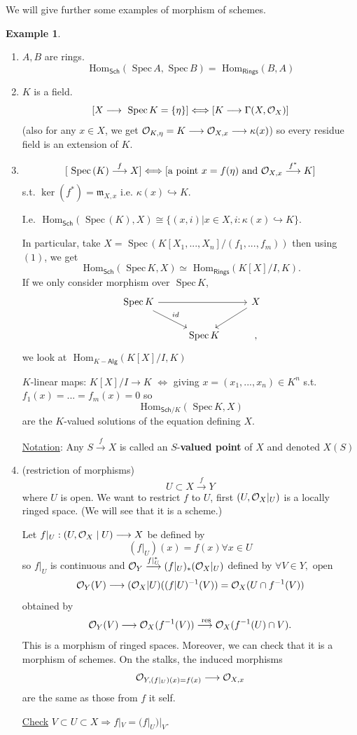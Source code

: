 \documentclass[11pt]{article}
\theoremstyle{definition}
\newtheorem{ex}[thm]{Example}
\renewcommand{\hom}{\text{ Hom}}
\newcommand{\spec}{\text{ Spec}\,}
\newcommand{\res}{\text{ res}}
\newcommand{\scm}{{\mathfrak m}}
\newcommand{\calo}{{\cal O}}
\newcommand{\Lrta}{\Longrightarrow}
\newcommand{\lrta}{\longrightarrow}
\newcommand{\Llrta}{\Longleftrightarrow}
\newcommand{\inj}{\hookrightarrow}
\begin{document}
We will give further some examples of morphism of schemes.
\begin{ex}\ 
\begin{enumerate}[label=(\arabic*)]
\item $A, B$ are rings. 
$$
\hom_{\mathsf{Sch}}(\spec A,\spec B)=\hom_{\mathsf{Rings}}(B,A)
$$
\item $K$ is a field.
$$
[X\lrta \spec K=\{\eta\}]\Llrta [K\lrta \Gamma(X,\calo_X)]
$$
(also for any $x\in X$, we get $\calo_{K,\eta}=K\lrta \calo_{X,x}\lrta \kappa(x)$) so every residue field is an extension of $K$.
\item $$
[\spec(K)\overset{f}{\lrta } X]\Llrta [\text{a point $x=f(\eta)$ and } \calo_{X,x}\overset{f^*}{\lrta } K]
$$
s.t. $\ker(f^*)=\scm_{X,x}$ i.e. $\kappa(x)\inj K$.

I.e. $\hom_{\mathsf{Sch}}(\spec(K), X)\cong\{(x,i)|x\in X, i:\kappa(x)\inj K\}$. 

In particular, take $X=\spec(K[X_1,...,X_n]/(f_1,...,f_m))$ then using $(1)$, we get 
$$
\hom_{\mathsf{Sch}}(\spec K, X)\simeq \hom_{\mathsf{Rings}}(K[X]/I, K).
$$
If we only consider morphism over $\spec K$,
$$
\begin{tikzcd}
\spec K \arrow[rd, "id"] \arrow[rr] &  &X \arrow[ld] \\
 & \spec K & ,
\end{tikzcd}
$$
we look at $\hom_{K-\mathsf{Alg}}(K[X]/I ,K)$

$K$-linear maps: $K[X]/I\lrta K$ $\Llrta $ giving $x=(x_1,...,x_n)\in K^n$ s.t. $f_1(x)=...=f_m(x)=0$ so
$$
\hom_{\mathsf{Sch}/ K}(\spec K, X)
$$
are the $K$-valued solutions of the equation defining $X$.

\underline{Notation}: Any $S\overset{f}{\lrta }X$ is called an $S$-\textbf{valued point} of $X$ and denoted $X(S)$
\item  (restriction of morphisms)
$$
U\subset X\overset{f}{\lrta} Y
$$
where $U$ is open. We want to restrict $f$ to $U$, first $(U,\calo_X|_U)$ is a locally ringed space. (We will see that it is a scheme.)

Let $f|_U:(U,\calo_X\mid U)\lrta X$ be defined by 
$$
(f|_U)(x)=f(x)\forall x\in U
$$
so $f|_U$ is continuous and 
$\calo_Y\overset{f|_U^*}{\lrta }(f|_U)_*(\calo_X|_U)$ defined by 
$
\forall V\in Y,\text{ open }
$
$$
\calo_Y(V)\lrta (\calo_X|U)((f|U)^{-1} (V))=\calo_X(U\cap f^{-1}(V))
$$
obtained by 
$$
\calo_Y(V)\lrta \calo_X(f^{-1}(V))\overset{\res}{\lrta}\calo_{X}(f^{-1}(U)\cap V).
$$
This is a morphism of ringed spaces. Moreover, we can check that it is a morphism of schemes. On the stalks, the induced morphisms 
$$
\calo_{Y,(f|_U)(x)=f(x)}\lrta \calo_{X,x}
$$
are the same as those from $f$ it self. 

\underline{Check} $V\subset U\subset X\Lrta f|_V=(f|_U)|_V$.
\end{enumerate}
\end{ex}
\end{document}

